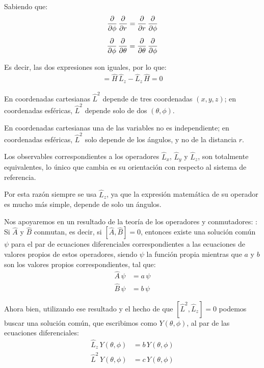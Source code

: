 Sabiendo que:
\begin{align*}
\pdv{\phi} \, \pdv{r} = \pdv{r} \, \pdv{\phi} \\[0.5em]
\pdv{\phi} \, \pdv{\theta} = \pdv{\theta} \, \pdv{\phi}
\end{align*}

Es decir, las dos expresiones son iguales, por lo que:
\begin{align*}
[\hat{H}, \hat{L}_{z}] = \hat{H} \, \hat{L}_{z} - \hat{L}_{z} \, \hat{H} = 0
\end{align*}

En coordenadas cartesianas $\hat{L}^{2}$ depende de tres coordenadas $(x, y, z)$; en coordenadas esféricas, $\hat{L}^{2}$ depende solo de dos $(\theta, \phi)$.
\par
En coordenadas cartesianas una de las variables no es independiente; en coordenadas esféricas, $\hat{L}^{2}$ solo depende de los ángulos, y no de la distancia $r$.
\par
Los observables correspondientes a los operadores $\hat{L}_{x}$, $\hat{L}_{y}$ y $\hat{L}_{z}$, son totalmente equivalentes, lo único que cambia es su orientación con respecto al sistema de referencia.
\par
Por esta razón siempre se usa $\hat{L}_{z}$, ya que la expresión matemática de su operador es mucho más simple, depende de solo un ángulos.
\par
Nos apoyaremos en un resultado de la teoría de los operadores y conmutadores: : Si $\hat{A}$ y $\hat{B}$ conmutan, es decir, si  $[\hat{A}, \hat{B}] = 0$, entonces existe una solución común $\psi$  para el par de ecuaciones diferenciales correspondientes a las ecuaciones de valores propios de estos operadores, siendo $\psi$ la función propia mientras que $a$ y $b$ son los valores propios correspondientes, tal que:
\begin{align*}
\hat{A} \, \psi &= a \, \psi \\[0.5em]
\hat{B} \, \psi &= b \, \psi
\end{align*}

Ahora bien, utilizando ese resultado y el hecho de que $[\hat{L}^{2}, \hat{L}_{z}] = 0$ podemos buscar una solución común, que escribimos como $Y(\theta, \phi)$, al par de las ecuaciones diferenciales:
\begin{align*}
\hat{L}_{z} \, Y(\theta, \phi) &= b \, Y(\theta, \phi) \\[0.5em]
\hat{L}^{2} \, Y(\theta, \phi) &= c \, Y(\theta, \phi)
\end{align*}

